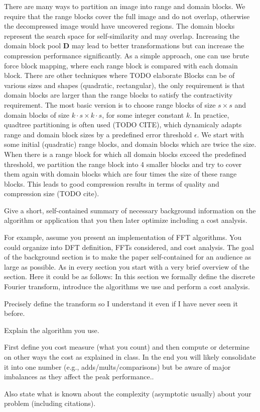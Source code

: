 There are many ways to partition an image into range and domain blocks. We require that the range blocks cover the full image and do not overlap, otherwise the
decompressed image would have uncovered regions. The domain blocks represent the search space for self-similarity and may overlap. 
Increasing the domain block pool $\boldsymbol{D}$ may lead to better transformations but can increase the compression performance significantly.
As a simple approach, one can use brute force block mapping, where each range block is compared with each domain block. 
There are other techniques where TODO elaborate
Blocks can be of various sizes and shapes (quadratic, rectangular), the only requirement is that domain blocks are larger than the range blocks to satisfy the
contractivity requirement. The most basic version is to choose range blocks of size $s \times s$ and domain blocks of size $k\cdot s \times k \cdot s$, for some
integer constant $k$. In practice, quadtree partitioning is often used (TODO CITE), which dynamicaly adapts range and domain block sizes by a
predefined error threshold $\epsilon$. We start with some initial (quadratic) range blocks, and domain blocks which
are twice the size. When there is a range block for which all domain blocks exceed the predefined threshold, we partition
the range block into 4 smaller blocks and try to cover them again with domain blocks which are four times the size of these range blocks.
This leads to good compression results in terms of quality and compression size (TODO cite). 


Give a short, self-contained summary of necessary
background information on the algorithm or application that you then later optimize including a cost analysis.

For example, assume you present an
implementation of FFT algorithms. You could organize into DFT
definition, FFTs considered, and cost analysis. The goal of the
background section is to make the paper self-contained for an audience
as large as possible. As in every section
you start with a very brief overview of the section. Here it could be as follows: In this section
we formally define the discrete Fourier transform, introduce the algorithms we use
and perform a cost analysis.

Precisely define the transform so I understand it even if I have never
seen it before.

Explain the algorithm you use.

First define you cost measure (what you count) and then compute or determine on other ways the
cost as explained in class. In the end you will likely consolidate it into one number (e.g., adds/mults/comparisons) but be aware of major imbalances as they affect the peak performance..

Also state what is known about the complexity (asymptotic usually)
about your problem (including citations).